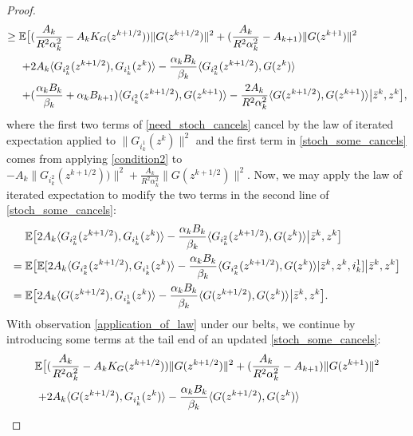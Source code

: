 \documentclass[11pt,reqno,oneside]{amsart}
\theoremstyle{definition}
\numberwithin{equation}{section}
\begin{document}
\begin{proof}
\begin{align}
        \geq \mathbb{E}\big{[} & (\frac{A_{k}}{R^{2}\alpha_{k}^{2}} - A_{k}K_{G}(z^{k+1/2}))\|G(z^{k+1/2})\|^{2} + (\frac{A_{k}}{R^{2}\alpha_{k}^{2}} - A_{k+1})\|G(z^{k+1})\|^{2} \notag \\
        +&2A_{k}\langle G_{i_{k}^{2}}(z^{k+1/2}), G_{i_{k}^{1}}(z^{k})\rangle - \frac{\alpha_{k}B_{k}}{\beta_{k}} \langle G_{i_{k}^{2}}(z^{k+1/2}), G(z^{k})\rangle \notag \\
        +&(\frac{\alpha_{k}B_{k}}{\beta_{k}} + \alpha_{k}B_{k+1})\langle G_{i_{k}^{2}}(z^{k+1/2}), G(z^{k+1})\rangle - \frac{2A_{k}}{R^{2}\alpha_{k}^{2}}\langle G(z^{k+1/2}), G(z^{k+1})\rangle \big{|} \bar{z}^{k}, z^{k}\big{]}, \label{stoch_some_cancels}
    \end{align}
    where the first two terms of \eqref{need_stoch_cancels} cancel by the law of iterated expectation applied to $\|G_{i_{k}^{1}}(z^{k})\|^{2}$ and the first term in \eqref{stoch_some_cancels} comes from applying \ref{condition2} to $- A_{k}\|G_{i_{k}^{2}}(z^{k+1/2}))\|^{2} + \frac{A_{k}}{R^{2}\alpha_{k}^{2}}\|G(z^{k+1/2})\|^{2}$.
    Now, we may apply the law of iterated expectation to modify the two terms in the second line of \eqref{stoch_some_cancels}:
    \begin{align}
        \mathbb{E}\big{[}& 2A_{k}\langle G_{i_{k}^{2}}(z^{k+1/2}), G_{i_{k}^{1}}(z^{k})\rangle - \frac{\alpha_{k}B_{k}}{\beta_{k}} \langle G_{i_{k}^{2}}(z^{k+1/2}), G(z^{k})\rangle \big{|} \bar{z}^{k},z^{k} \big{]} \notag \\
        =\mathbb{E}\big{[}& \mathbb{E}[ 2A_{k}\langle G_{i_{k}^{2}}(z^{k+1/2}), G_{i_{k}^{1}}(z^{k})\rangle - \frac{\alpha_{k}B_{k}}{\beta_{k}} \langle G_{i_{k}^{2}}(z^{k+1/2}), G(z^{k})\rangle |\bar{z}^{k}, z^{k}, i_{k}^{1}] \big{|} \bar{z}^{k}, z^{k}\big{]} \notag \\
        =\mathbb{E}\big{[}& 2A_{k}\langle G(z^{k+1/2}), G_{i_{k}^{1}}(z^{k})\rangle - \frac{\alpha_{k}B_{k}}{\beta_{k}} \langle G(z^{k+1/2}), G(z^{k})\rangle \big{|} \bar{z}^{k},z^{k} \big{]}.\label{application_of_law}
    \end{align}
    With observation \eqref{application_of_law} under our belts, we continue by introducing some terms at the tail end of an updated \eqref{stoch_some_cancels}:
    \begin{align}
        \mathbb{E}\big{[} & (\frac{A_{k}}{R^{2}\alpha_{k}^{2}} - A_{k}K_{G}(z^{k+1/2}))\|G(z^{k+1/2})\|^{2} + (\frac{A_{k}}{R^{2}\alpha_{k}^{2}} - A_{k+1})\|G(z^{k+1})\|^{2} \notag \\
        +&2A_{k}\langle G(z^{k+1/2}), G_{i_{k}^{1}}(z^{k})\rangle - \frac{\alpha_{k}B_{k}}{\beta_{k}} \langle G(z^{k+1/2}), G(z^{k})\rangle \notag \\

\end{align}
\end{proof}
\end{document}
